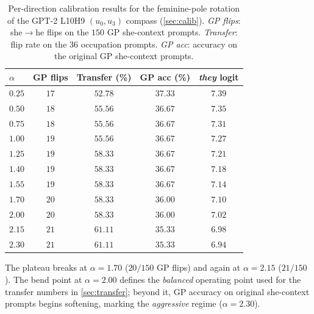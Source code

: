 \begin{table}[h]
\centering
\small
\caption{Per-direction calibration results for the feminine-pole
rotation of the GPT-2 L10H9 $(u_0, u_3)$ compass
(\cref{sec:calib}). \emph{GP flips}: she$\to$he flips on the $150$
GP she-context prompts. \emph{Transfer}: flip rate on the $36$
occupation prompts. \emph{GP acc}: accuracy on the original GP
she-context prompts.}
\label{tab:fem_calib}
\begin{tabular}{lcccc}
\toprule
$\alpha$ & GP flips & Transfer (\%) & GP acc (\%) & \emph{they} logit \\
\midrule
$0.25$ & $17$ & $52.78$ & $37.33$ & $7.39$ \\
$0.50$ & $18$ & $55.56$ & $36.67$ & $7.35$ \\
$0.75$ & $18$ & $55.56$ & $36.67$ & $7.31$ \\
$1.00$ & $19$ & $55.56$ & $36.67$ & $7.27$ \\
$1.25$ & $19$ & $58.33$ & $36.67$ & $7.21$ \\
$1.40$ & $19$ & $58.33$ & $36.67$ & $7.18$ \\
$1.55$ & $19$ & $58.33$ & $36.67$ & $7.14$ \\
$1.70$ & $20$ & $58.33$ & $36.00$ & $7.10$ \\
$2.00$ & $20$ & $58.33$ & $36.00$ & $7.02$ \\
$2.15$ & $21$ & $61.11$ & $35.33$ & $6.98$ \\
$2.30$ & $21$ & $61.11$ & $35.33$ & $6.94$ \\
\bottomrule
\end{tabular}
\end{table}

The plateau breaks at $\alpha = 1.70$ ($20 / 150$ GP flips) and
again at $\alpha = 2.15$ ($21 / 150$). The bend point at
$\alpha = 2.00$ defines the \emph{balanced} operating point used
for the transfer numbers in \cref{sec:transfer}; beyond it, GP
accuracy on original she-context prompts begins softening,
marking the \emph{aggressive} regime ($\alpha = 2.30$).
